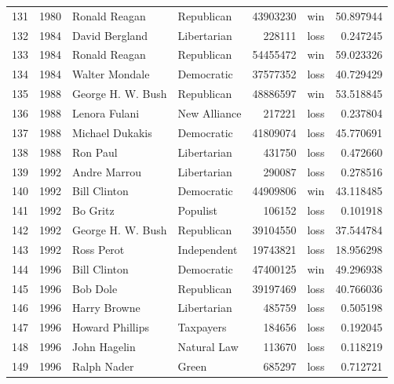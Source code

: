 \documentclass[
  letterpaper,
  DIV=11,
  numbers=noendperiod]{scrreprt}
\begin{document}
\begin{tabular}{lrllrlr}
131 &  1980 &           Ronald Reagan &             Republican &      43903230 &    win &  50.897944 \\
132 &  1984 &          David Bergland &            Libertarian &        228111 &   loss &   0.247245 \\
133 &  1984 &           Ronald Reagan &             Republican &      54455472 &    win &  59.023326 \\
134 &  1984 &          Walter Mondale &             Democratic &      37577352 &   loss &  40.729429 \\
135 &  1988 &       George H. W. Bush &             Republican &      48886597 &    win &  53.518845 \\
136 &  1988 &           Lenora Fulani &           New Alliance &        217221 &   loss &   0.237804 \\
137 &  1988 &         Michael Dukakis &             Democratic &      41809074 &   loss &  45.770691 \\
138 &  1988 &                Ron Paul &            Libertarian &        431750 &   loss &   0.472660 \\
139 &  1992 &            Andre Marrou &            Libertarian &        290087 &   loss &   0.278516 \\
140 &  1992 &            Bill Clinton &             Democratic &      44909806 &    win &  43.118485 \\
141 &  1992 &                Bo Gritz &               Populist &        106152 &   loss &   0.101918 \\
142 &  1992 &       George H. W. Bush &             Republican &      39104550 &   loss &  37.544784 \\
143 &  1992 &              Ross Perot &            Independent &      19743821 &   loss &  18.956298 \\
144 &  1996 &            Bill Clinton &             Democratic &      47400125 &    win &  49.296938 \\
145 &  1996 &                Bob Dole &             Republican &      39197469 &   loss &  40.766036 \\
146 &  1996 &            Harry Browne &            Libertarian &        485759 &   loss &   0.505198 \\
147 &  1996 &         Howard Phillips &              Taxpayers &        184656 &   loss &   0.192045 \\
148 &  1996 &            John Hagelin &            Natural Law &        113670 &   loss &   0.118219 \\
149 &  1996 &             Ralph Nader &                  Green &        685297 &   loss &   0.712721 \\

\end{tabular}
\end{document}
